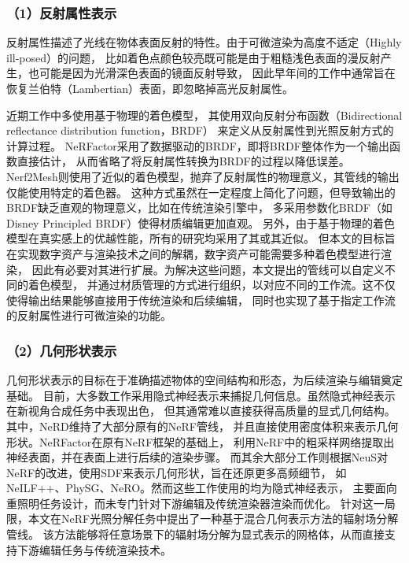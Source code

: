 \subsubsection*{（1）反射属性表示}

反射属性描述了光线在物体表面反射的特性。由于可微渲染为高度不适定（Highly ill-posed）的问题，
比如着色点颜色较亮既可能是由于粗糙浅色表面的漫反射产生，也可能是因为光滑深色表面的镜面反射导致，
因此早年间的工作\cite{Sato_1997, Zollh_fer_2015}中通常旨在恢复兰伯特（Lambertian）表面，即忽略掉高光反射属性。

近期工作\cite{Zhang_2023,10.5555/3600270.3601931}中多使用基于物理的着色模型，
其使用双向反射分布函数（Bidirectional reflectance distribution function，BRDF）
\cite{Cook_1981}来定义从反射属性到光照反射方式的计算过程。
NeRFactor\cite{zhang2021nerfactor}采用了数据驱动的BRDF，即将BRDF整体作为一个输出函数直接估计，
从而省略了将反射属性转换为BRDF的过程以降低误差。
Nerf2Mesh\cite{Tang_2023}则使用了近似的着色模型，抛弃了反射属性的物理意义，其管线的输出仅能使用特定的着色器。
这种方式虽然在一定程度上简化了问题，但导致输出的BRDF缺乏直观的物理意义，比如在传统渲染引擎中，
多采用参数化BRDF（如Disney Principled BRDF\cite{burley2012physically}）使得材质编辑更加直观。
另外，由于基于物理的着色模型在真实感上的优越性能，所有的研究均采用了其或其近似。
但本文的目标旨在实现数字资产与渲染技术之间的解耦，数字资产可能需要多种着色模型进行渲染，
因此有必要对其进行扩展。为解决这些问题，本文提出的管线可以自定义不同的着色模型，
并通过材质管理的方式进行组织，以对应不同的工作流。这不仅使得输出结果能够直接用于传统渲染和后续编辑，
同时也实现了基于指定工作流的反射属性进行可微渲染的功能。

\subsubsection*{（2）几何形状表示}

几何形状表示的目标在于准确描述物体的空间结构和形态，为后续渲染与编辑奠定基础。
目前，大多数工作采用隐式神经表示来捕捉几何信息。虽然隐式神经表示在新视角合成任务中表现出色，
但其通常难以直接获得高质量的显式几何结构。其中，NeRD\cite{Boss_2021}维持了大部分原有的NeRF管线，
并且直接使用密度体积来表示几何形状。NeRFactor\cite{zhang2021nerfactor}在原有NeRF框架的基础上，
利用NeRF中的粗采样网络提取出神经表面，并在表面上进行后续的渲染步骤。
而其余大部分工作则根据NeuS\cite{10.5555/3540261.3542342}对NeRF的改进，使用SDF来表示几何形状，旨在还原更多高频细节，
如NeILF++\cite{Zhang_2023}、PhySG\cite{Zhang_2021}、NeRO\cite{Liu_2023}。然而这些工作使用的均为隐式神经表示，
主要面向重照明任务设计，而未专门针对下游编辑及传统渲染器渲染而优化。
针对这一局限，本文在NeRF光照分解任务中提出了一种基于混合几何表示方法的辐射场分解管线。
该方法能够将任意场景下的辐射场分解为显式表示的网格体，从而直接支持下游编辑任务与传统渲染技术。

